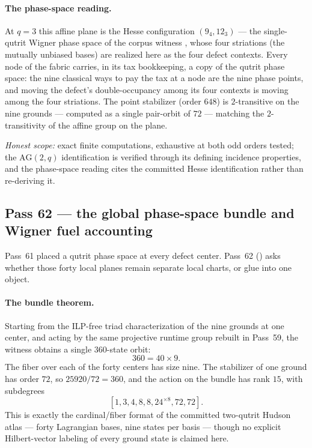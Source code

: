 \documentclass[11pt]{article}
\begin{document}
\paragraph{The phase-space reading.}  At \(q=3\) this affine plane is the
Hesse configuration \((9_4,12_3)\) --- the single-qutrit Wigner phase space of
the corpus witness , whose four
striations (the mutually unbiased bases) are realized here as the four defect
contexts.  Every node of the fabric carries, in its tax bookkeeping, a copy of
the qutrit phase space: the nine classical ways to pay the tax at a node are
the nine phase points, and moving the defect's double-occupancy among its four
contexts is moving among the four striations.  The point stabilizer (order
\(648\)) is \(2\)-transitive on the nine grounds --- computed as a single
pair-orbit of \(72\) --- matching the \(2\)-transitivity of the affine group
on the plane.

\emph{Honest scope:} exact finite computations, exhaustive at both odd orders
tested; the \(\mathrm{AG}(2,q)\) identification is verified through its
defining incidence properties, and the phase-space reading cites the
committed Hesse identification rather than re-deriving it.

\subsection{Pass 62 --- the global phase-space bundle and Wigner fuel accounting}
\label{sec:capstone-sixtytwo}

Pass~61 placed a qutrit phase space at every defect center.  Pass~62
() asks whether those
forty local planes remain separate local charts, or glue into one object.

\paragraph{The bundle theorem.}  Starting from the ILP-free triad
characterization of the nine grounds at one center, and acting by the same
projective runtime group rebuilt in Pass~59, the witness obtains a single
\(360\)-state orbit:
\[
  360 = 40 \times 9.
\]
The fiber over each of the forty centers has size nine.  The stabilizer of one
ground has order \(72\), so \(25920/72=360\), and the action on the bundle has
rank \(15\), with subdegrees
\[
  [1,3,4,8,8,24^{\times 8},72,72].
\]
This is exactly the cardinal/fiber format of the committed two-qutrit Hudson
atlas --- forty Lagrangian bases, nine states per basis --- though no explicit
Hilbert-vector labeling of every ground state is claimed here.
\end{document}
